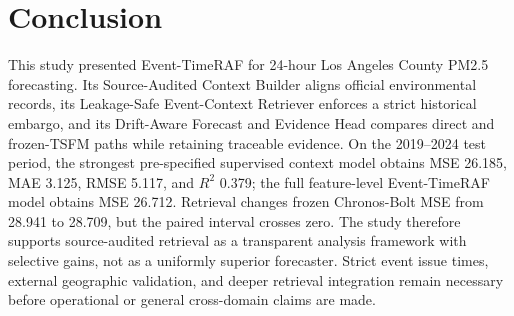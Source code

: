 \section{Conclusion}

This study presented Event-TimeRAF for 24-hour Los Angeles County PM2.5
forecasting. Its Source-Audited Context Builder aligns official environmental
records, its Leakage-Safe Event-Context Retriever enforces a strict historical
embargo, and its Drift-Aware Forecast and Evidence Head compares direct and
frozen-TSFM paths while retaining traceable evidence. On the 2019--2024 test
period, the strongest pre-specified supervised context model obtains MSE 26.185,
MAE 3.125, RMSE 5.117, and $R^2$ 0.379; the full feature-level Event-TimeRAF
model obtains MSE 26.712. Retrieval changes frozen Chronos-Bolt MSE from 28.941
to 28.709, but the paired interval crosses zero. The study therefore
supports source-audited retrieval as a transparent analysis framework with
selective gains, not as a uniformly superior forecaster. Strict event issue
times, external geographic validation, and deeper retrieval integration remain
necessary before operational or general cross-domain claims are made.
